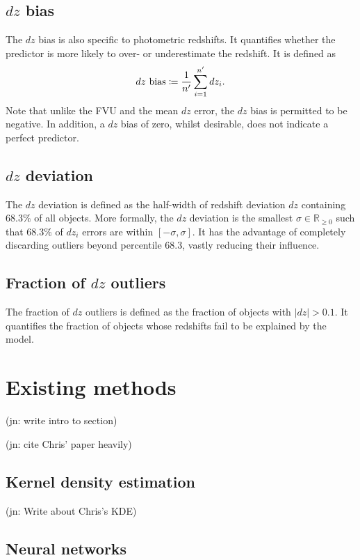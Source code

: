 \documentclass[11pt,twoside]{report}
\newcommand\bbR{\mathbb{R}}
\newcommand\abs[1]{\left|#1\right|}
\newcommand\jn[1]{{\color{red}(jn: #1)}}
\begin{document}
\subsection{$dz$ bias}

The $dz$ bias is also specific to photometric redshifts. It quantifies whether the predictor is more likely to over- or underestimate the redshift. It is defined as\[
  \textrm{$dz$ bias} \coloneqq \frac{1}{n'}\sum_{i=1}^{n'} dz_i \text.
\] Note that unlike the FVU and the mean $dz$ error, the $dz$ bias is permitted to be negative. In addition, a $dz$ bias of zero, whilst desirable, does not indicate a perfect predictor.

\subsection{$dz$ deviation}

The $dz$ deviation is defined as the half-width of redshift deviation $dz$ containing $68.3\%$ of all objects. More formally, the $dz$ deviation is the smallest $\sigma \in \bbR_{\geq0}$ such that $68.3\%$ of $dz_i$ errors are within $[-\sigma, \sigma]$. It has the advantage of completely discarding outliers beyond percentile $68.3$, vastly reducing their influence.

\subsection{Fraction of $dz$ outliers}

The fraction of $dz$ outliers is defined as the fraction of objects with $\abs{dz} > 0.1$. It quantifies the fraction of objects whose redshifts fail to be explained by the model.

\section{Existing methods}

\jn{write intro to section}

\jn{cite Chris' paper heavily}

\subsection{Kernel density estimation}

\jn{Write about Chris's KDE}

\subsection{Neural networks}
\end{document}
